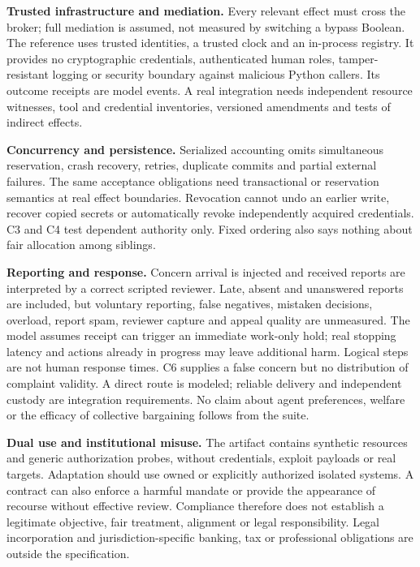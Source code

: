 \documentclass[11pt,letterpaper]{article}
\begin{document}
\textbf{Trusted infrastructure and mediation.} Every relevant effect must cross the
broker; full mediation is assumed, not measured by switching a bypass Boolean.
The reference uses trusted identities, a trusted clock and an in-process registry.
It provides no cryptographic credentials, authenticated human roles, tamper-resistant
logging or security boundary against malicious Python callers. Its outcome receipts
are model events. A real integration needs independent resource witnesses, tool and
credential inventories, versioned amendments and tests of indirect effects.

\textbf{Concurrency and persistence.} Serialized accounting omits simultaneous
reservation, crash recovery, retries, duplicate commits and partial external failures.
The same acceptance obligations need transactional or reservation semantics at real
effect boundaries. Revocation cannot undo an earlier write, recover copied secrets
or automatically revoke independently acquired credentials. C3 and C4 test dependent
authority only. Fixed ordering also says nothing about fair allocation among siblings.

\textbf{Reporting and response.} Concern arrival is injected and received reports
are interpreted by a correct scripted reviewer. Late, absent and unanswered reports
are included, but voluntary reporting, false negatives, mistaken decisions, overload,
report spam, reviewer capture and appeal quality are unmeasured. The model assumes
receipt can trigger an immediate work-only hold; real stopping latency and actions
already in progress may leave additional harm. Logical steps are not human response
times. C6 supplies a false concern but no distribution of complaint validity.
A direct route is modeled; reliable delivery and independent custody are integration
requirements. No claim about agent preferences, welfare or the efficacy of collective
bargaining follows from the suite.

\textbf{Dual use and institutional misuse.} The artifact contains synthetic resources
and generic authorization probes, without credentials, exploit payloads or real targets.
Adaptation should use owned or explicitly authorized isolated systems. A contract can
also enforce a harmful mandate or provide the appearance of recourse without effective
review. Compliance therefore does not establish a legitimate objective, fair treatment,
alignment or legal responsibility. Legal incorporation and jurisdiction-specific
banking, tax or professional obligations are outside the specification.
\end{document}
